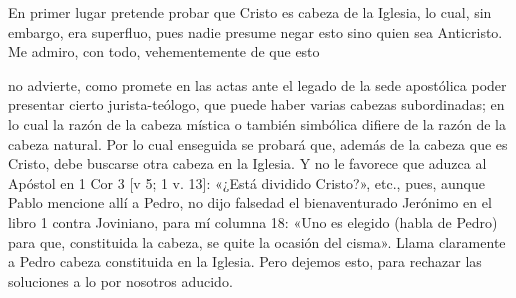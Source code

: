 En primer lugar pretende probar que Cristo es cabeza de la Iglesia, lo cual, sin embargo, era superfluo, pues nadie presume negar esto sino quien sea Anticristo. Me admiro, con todo, vehementemente de que esto

no advierte, como promete en las actas ante el legado de la sede apostólica poder presentar cierto jurista-teólogo, que puede haber varias cabezas subordinadas; en lo cual la razón de la cabeza mística o también simbólica difiere de la razón de la cabeza natural. Por lo cual enseguida se probará que, además de la cabeza que es Cristo, debe buscarse otra cabeza en la Iglesia. Y no le favorece que aduzca al Apóstol en 1 Cor 3 [v 5; 1 v. 13]: «¿Está dividido Cristo?», etc., pues, aunque Pablo mencione allí a Pedro, no dijo falsedad el bienaventurado Jerónimo en el libro 1 contra Joviniano, para mí columna 18: «Uno es elegido (habla de Pedro) para que, constituida la cabeza, se quite la ocasión del cisma». Llama claramente a Pedro cabeza constituida en la Iglesia. Pero dejemos esto, para rechazar las soluciones a lo por nosotros aducido.

